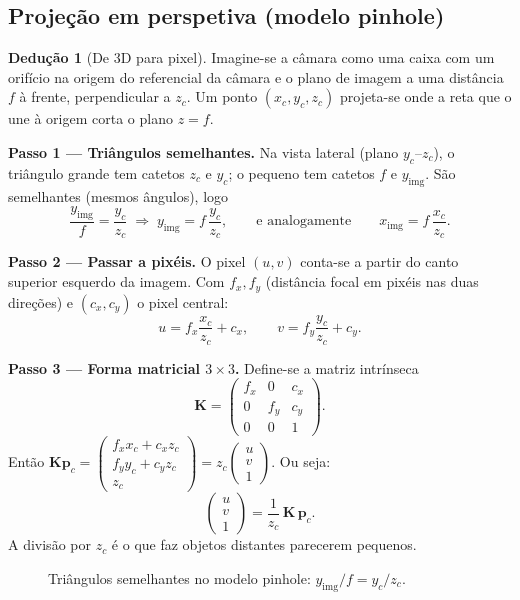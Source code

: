 \documentclass[11pt,a4paper]{article}
\newcommand{\vv}[1]{\mathbf{#1}}              %
\newcommand{\col}[3]{\begin{pmatrix}#1\\#2\\#3\end{pmatrix}}
\theoremstyle{definition}
\newtheorem{deducao}{Dedução}[section]
\begin{document}
\subsection{Projeção em perspetiva (modelo pinhole)}
\begin{deducao}[De 3D para pixel]
Imagine-se a câmara como uma caixa com um orifício na origem do referencial da câmara e o plano de imagem a uma distância $f$ à frente, perpendicular a $z_c$. Um ponto $(x_c,y_c,z_c)$ projeta-se onde a reta que o une à origem corta o plano $z=f$.

\textbf{Passo 1 --- Triângulos semelhantes.} Na vista lateral (plano $y_c$--$z_c$), o triângulo grande tem catetos $z_c$ e $y_c$; o pequeno tem catetos $f$ e $y_{\text{img}}$. São semelhantes (mesmos ângulos), logo
\[
\frac{y_{\text{img}}}{f}=\frac{y_c}{z_c}\;\Rightarrow\; y_{\text{img}}=f\,\frac{y_c}{z_c},
\qquad\text{e analogamente}\qquad x_{\text{img}}=f\,\frac{x_c}{z_c}.
\]

\textbf{Passo 2 --- Passar a pixéis.} O pixel $(u,v)$ conta-se a partir do canto superior esquerdo da imagem. Com $f_x,f_y$ (distância focal em pixéis nas duas direções) e $(c_x,c_y)$ o pixel central:
\[
u=f_x\frac{x_c}{z_c}+c_x,\qquad v=f_y\frac{y_c}{z_c}+c_y .
\]

\textbf{Passo 3 --- Forma matricial $3\times3$.} Define-se a matriz intrínseca
\[
\mathbf{K}=\begin{pmatrix}f_x&0&c_x\\0&f_y&c_y\\0&0&1\end{pmatrix}.
\]
Então $\mathbf{K}\vv{p}_c=\col{f_xx_c+c_xz_c}{f_yy_c+c_yz_c}{z_c}=z_c\col{u}{v}{1}$. Ou seja:
\[
\col{u}{v}{1}=\frac{1}{z_c}\,\mathbf{K}\,\vv{p}_c .
\]
A divisão por $z_c$ é o que faz objetos distantes parecerem pequenos.
\end{deducao}

\begin{figure}[H]
\centering
{}
\caption{Triângulos semelhantes no modelo pinhole: $y_{\text{img}}/f=y_c/z_c$.}
\end{figure}
\end{document}
